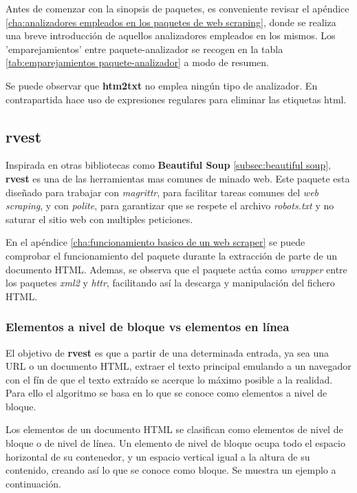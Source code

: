 Antes de comenzar con la sinopsis de paquetes, es conveniente revisar el apéndice \ref{cha:analizadores 
empleados en los paquetes de web scraping}, donde se realiza una breve introducción de aquellos analizadores 
empleados en los mismos. Los ’emparejamientos’ entre paquete-analizador se recogen en la tabla 
\ref{tab:emparejamientos paquete-analizador} a modo de resumen.

Se puede observar que \textbf{htm2txt} no emplea ningún tipo de analizador. En contrapartida hace uso de 
expresiones regulares para eliminar las etiquetas html.

\subsection{rvest}
\label{subsec:rvest}

Inspirada en otras bibliotecas como \textbf{Beautiful Soup} \ref{subsec:beautiful soup}, \textbf{rvest} 
\cite{rvest-cran} es una de las herramientas mas comunes de minado web. Este paquete esta diseñado para 
trabajar con \emph{magrittr}, para facilitar tareas comunes del \emph{web scraping}, y con \emph{polite}, 
para garantizar que se respete el archivo \emph{robots.txt} y no saturar el sitio web con multiples 
peticiones.

En el apéndice \ref{cha:funcionamiento basico de un web scraper} se puede comprobar el funcionamiento del
paquete durante la extracción de parte de un documento HTML. Ademas, se observa que el paquete actúa como 
\emph{wrapper} entre los paquetes \emph{xml2} y \emph{httr}, facilitando así la descarga y manipulación 
del fichero HTML.

\subsubsection{Elementos a nivel de bloque vs elementos en línea}
\label{subsubsec:elementos a nivel de bloque vs elementos en linea}

El objetivo de \textbf{rvest} es que a partir de una determinada entrada, ya sea una URL o un documento
HTML, extraer el texto principal emulando a un navegador con el fín de que el texto extraído se acerque 
lo máximo posible a la realidad. Para ello el algoritmo se basa en lo que se conoce como elementos a nivel 
de bloque.

Los elementos de un documento HTML se clasifican como elementos de nivel de bloque o de nivel de línea. Un 
elemento de nivel de bloque ocupa todo el espacio horizontal de su contenedor, y un espacio vertical igual 
a la altura de su contenido, creando así lo que se conoce como bloque. Se muestra un ejemplo a continuación.

